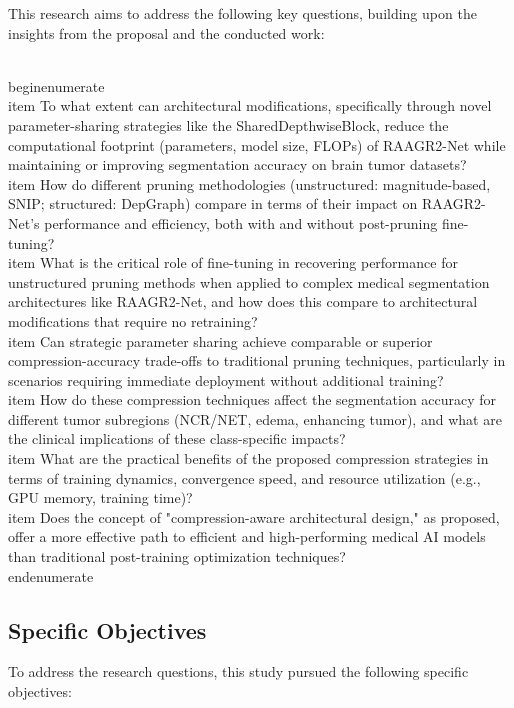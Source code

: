 \documentclass[12pt,a4paper]{article}
\begin{document}
This research aims to address the following key questions, building upon the insights from the proposal and the conducted work:

\\begin{enumerate}
    \\item To what extent can architectural modifications, specifically through novel parameter-sharing strategies like the SharedDepthwiseBlock, reduce the computational footprint (parameters, model size, FLOPs) of RAAGR2-Net while maintaining or improving segmentation accuracy on brain tumor datasets?
    \\item How do different pruning methodologies (unstructured: magnitude-based, SNIP; structured: DepGraph) compare in terms of their impact on RAAGR2-Net's performance and efficiency, both with and without post-pruning fine-tuning?
    \\item What is the critical role of fine-tuning in recovering performance for unstructured pruning methods when applied to complex medical segmentation architectures like RAAGR2-Net, and how does this compare to architectural modifications that require no retraining?
    \\item Can strategic parameter sharing achieve comparable or superior compression-accuracy trade-offs to traditional pruning techniques, particularly in scenarios requiring immediate deployment without additional training?
    \\item How do these compression techniques affect the segmentation accuracy for different tumor subregions (NCR/NET, edema, enhancing tumor), and what are the clinical implications of these class-specific impacts?
    \\item What are the practical benefits of the proposed compression strategies in terms of training dynamics, convergence speed, and resource utilization (e.g., GPU memory, training time)?
    \\item Does the concept of "compression-aware architectural design," as proposed, offer a more effective path to efficient and high-performing medical AI models than traditional post-training optimization techniques?
\\end{enumerate}

\subsection{Specific Objectives}
\label{sec:specific_objectives}

To address the research questions, this study pursued the following specific objectives:
\end{document}
